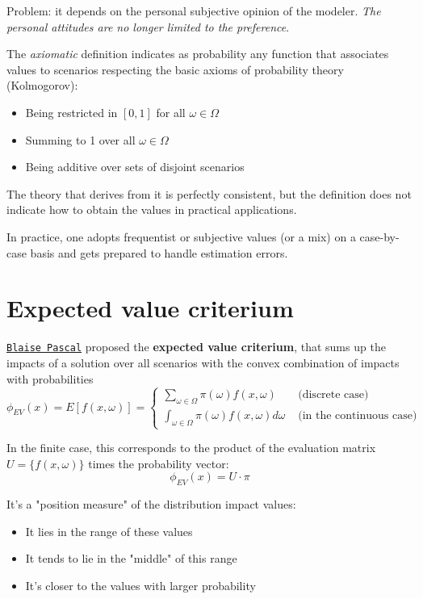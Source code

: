 Problem: it depends on the personal subjective opinion of the modeler. \textit{The personal attitudes are no longer limited to the preference}.

The \textit{axiomatic} definition indicates as probability any function that associates values to scenarios respecting the basic axioms of probability theory (Kolmogorov):
\begin{itemize}
	\item Being restricted in $[0,1]$ for all $\omega \in \Omega$
	
	\item Summing to 1 over all $\omega \in \Omega$
	
	\item Being additive over sets of disjoint scenarios
\end{itemize}
The theory that derives from it is perfectly consistent, but the definition does not indicate how to obtain the values in practical applications.

In practice, one adopts frequentist or subjective values (or a mix) on a case-by-case basis and gets prepared to handle estimation errors.

\section{Expected value criterium}
\label{sec:expectedvaluecrit}

\href{https://en.wikipedia.org/wiki/Blaise_Pascal}{\texttt{Blaise Pascal}} proposed the \textbf{expected value criterium}, that sums up the impacts of a solution over all scenarios with the convex combination of impacts with probabilities
$$ \phi_{EV} (x) = E \left[f (x, \omega)\right] = \begin{cases}
	\sum_{\omega \in \Omega} \pi (\omega) f(x, \omega) & \text{ (discrete case)} \\
	\int_{\omega \in \Omega} \pi(\omega) f(x, \omega) d \omega & \text{ (in the continuous case)}
\end{cases} $$

In the finite case, this corresponds to the product of the evaluation matrix $U = \{f (x, \omega)\}$ times the probability vector:
$$ \phi_{EV} (x) = U \cdot \pi $$

It's a "position measure" of the distribution impact values: 
\begin{itemize}
	\item It lies in the range of these values 
	
	\item It tends to lie in the "middle" of this range
	
	\item It's closer to the values with larger probability 
\end{itemize}

